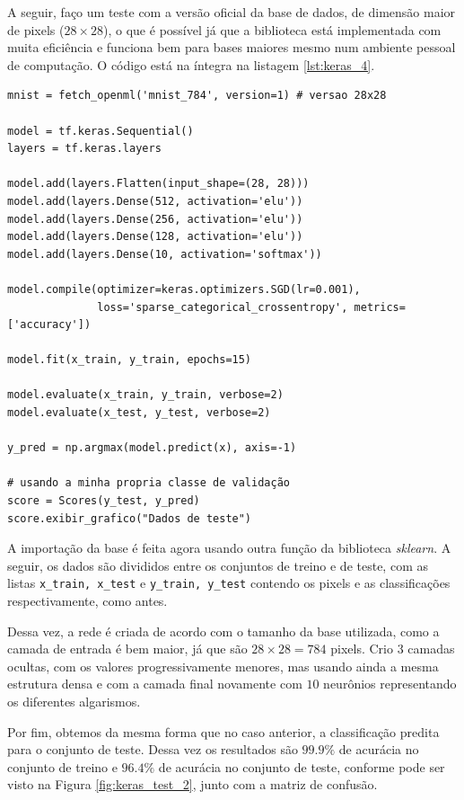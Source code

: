 A seguir, faço um teste com a versão oficial da base de dados, de dimensão maior de pixels (${28\times28}$), o que é possível já que a biblioteca está implementada com muita eficiência e funciona bem para bases maiores mesmo num ambiente pessoal de computação. O código está na íntegra na listagem \ref{lst:keras_4}.
\newline
\estiloR
\begin{lstlisting}[caption={Trecho do script \eng{mnist\_keras.py}},label={lst:keras_4},escapeinside={\%}]
mnist = fetch_openml('mnist_784', version=1) # versao 28x28

model = tf.keras.Sequential()
layers = tf.keras.layers

model.add(layers.Flatten(input_shape=(28, 28)))
model.add(layers.Dense(512, activation='elu'))
model.add(layers.Dense(256, activation='elu'))
model.add(layers.Dense(128, activation='elu'))
model.add(layers.Dense(10, activation='softmax'))

model.compile(optimizer=keras.optimizers.SGD(lr=0.001),
              loss='sparse_categorical_crossentropy', metrics=['accuracy'])

model.fit(x_train, y_train, epochs=15)

model.evaluate(x_train, y_train, verbose=2)
model.evaluate(x_test, y_test, verbose=2)

y_pred = np.argmax(model.predict(x), axis=-1)

# usando a minha propria classe de validação
score = Scores(y_test, y_pred)
score.exibir_grafico("Dados de teste")
\end{lstlisting}


A importação da base é feita agora usando outra função da biblioteca \emph{sklearn}. A seguir, os dados são divididos entre os conjuntos de treino e de teste, com as listas \texttt{x\_train, x\_test} e \texttt{y\_train, y\_test} contendo os pixels e as classificações respectivamente, como antes.

Dessa vez, a rede é criada de acordo com o tamanho da base utilizada, como a camada de entrada é bem maior, já que são ${28\times28 = 784}$ pixels. Crio $3$ camadas ocultas, com os valores progressivamente menores, mas usando ainda a mesma estrutura densa e com a camada final novamente com $10$ neurônios representando os diferentes algarismos.

Por fim, obtemos da mesma forma que no caso anterior, a classificação predita para o conjunto de teste. Dessa vez os resultados são $99.9\%$ de acurácia no conjunto de treino e $96.4\%$ de acurácia no conjunto de teste, conforme pode ser visto na Figura \ref{fig:keras_test_2}, junto com a matriz de confusão.

